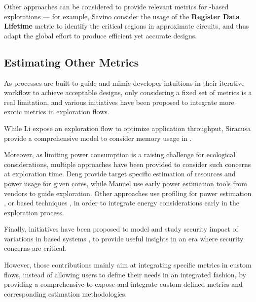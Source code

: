         Other approaches can be considered to provide relevant metrics for -based explorations --- for example, Savino \etal{} \cite{savino_approximate_2019} consider the usage of the {\bf Register Data Lifetime} metric to identify the critical regions in approximate circuits, and thus adapt the global effort to produce efficient yet accurate designs.

    \subsection{Estimating Other Metrics}
    \label{ch.state:sec.metric:ssec.other}
        As  processes are built to guide and mimic developer intuitions in their iterative workflow to achieve acceptable designs, only considering a fixed set of metrics is a real limitation, and various initiatives have been proposed to integrate more exotic metrics in exploration flows.

        While Li \etal{} \cite{li_resource-aware_2015} expose an exploration flow to optimize application throughput, Siracusa \etal{} \cite{siracusa_comprehensive_2021} provide a comprehensive model to consider memory usage in .

        Moreover, as limiting power consumption is a raising challenge for ecological considerations, multiple approaches have been provided to consider such concerns at exploration time.
        Deng \etal{} \cite{deng_accurate_2008} provide target specific estimation of resources and power usage for given  cores, while Manuel \etal{} \cite{manuel_model-based_2020} use early power estimation tools from vendors \cite{intel_power_2021}\cite{xilinx_power_2021} to guide exploration.
        Other approaches use profiling for power estimation \cite{oneal_hlspredict_2018}, or  based techniques \cite{lin_hl-pow_2020}, in order to integrate energy considerations early in the exploration process.

        Finally, initiatives have been proposed to model and study security impact of variations in   based systems \cite{akram_enabling_2021}\cite{gressl_design_2021}, to provide useful insights in an era where security concerns are critical.

        However, those contributions mainly aim at integrating specific metrics in custom flows, instead of allowing users to define their needs in an integrated fashion, by providing a comprehensive  to expose and integrate custom defined metrics and corresponding estimation methodologies.
        
